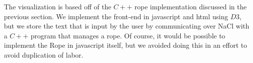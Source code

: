 \documentclass[12pt]{article}
\begin{document}
The visualization is based off of the $C++$ rope implementation discussed in the previous section. We implement the front-end in javascript and html using $D3$, but we store the text that is input by the user by communicating over NaCl with a $C++$ program that manages a rope. Of course, it would be possible to implement the Rope in javascript itself, but we avoided doing this in an effort to avoid duplication of labor.


\end{document}
